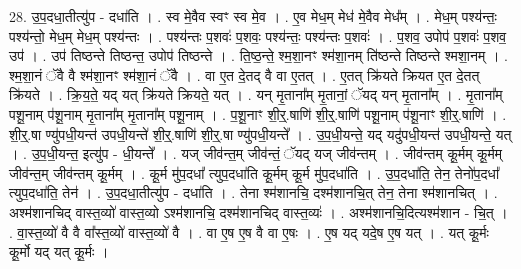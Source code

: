 \documentclass[17pt]{extarticle}
\begin{document}
28. उ॒प॒दधा॒तीत्यु॑प - दधा॑ति । . स्व मे॒वैव स्वꣳ स्व मे॒व । . ए॒व मेध॒म् मेध॑ मे॒वैव मेध᳚म् । . मेध॒म् पश्य॑न्तः॒ पश्य॑न्तो॒ मेध॒म् मेध॒म् पश्य॑न्तः । . पश्य॑न्तः प॒शवः॑ प॒शवः॒ पश्य॑न्तः॒ पश्य॑न्तः प॒शवः॑ । . प॒शव॒ उपोप॑ प॒शवः॑ प॒शव॒ उप॑ । . उप॑ तिष्ठन्ते तिष्ठन्त॒ उपोप॑ तिष्ठन्ते । . ति॒ष्ठ॒न्ते॒ श्म॒शा॒नꣳ श्म॑शा॒नम् ति॑ष्ठन्ते तिष्ठन्ते श्मशा॒नम् । . श्म॒शा॒नं ॅवै वै श्म॑शा॒नꣳ श्म॑शा॒नं ॅवै । . वा ए॒त दे॒तद् वै वा ए॒तत् । . ए॒तत् क्रि॑यते क्रियत ए॒त दे॒तत् क्रि॑यते । . क्रि॒य॒ते॒ यद् यत् क्रि॑यते क्रियते॒ यत् । . यन् मृ॒ताना᳚म् मृ॒तानां॒ ॅयद् यन् मृ॒ताना᳚म् । . मृ॒ताना᳚म् पशू॒नाम् प॑शू॒नाम् मृ॒ताना᳚म् मृ॒ताना᳚म् पशू॒नाम् । . प॒शू॒नाꣳ शी॒र्॒.षाणि॑ शी॒र्॒.षाणि॑ पशू॒नाम् प॑शू॒नाꣳ शी॒र्॒.षाणि॑ । . शी॒र्॒.षा ण्यु॑पधी॒यन्त॑ उपधी॒यन्ते॑ शी॒र्॒.षाणि॑ शी॒र्॒.षा ण्यु॑पधी॒यन्ते᳚ । . उ॒प॒धी॒यन्ते॒ यद् यदु॑पधी॒यन्त॑ उपधी॒यन्ते॒ यत् । . उ॒प॒धी॒यन्त॒ इत्यु॑प - धी॒यन्ते᳚ । . यज् जीव॑न्त॒म् जीव॑न्तं॒ ॅयद् यज् जीव॑न्तम् । . जीव॑न्तम् कू॒र्मम् कू॒र्मम् जीव॑न्त॒म् जीव॑न्तम् कू॒र्मम् । . कू॒र्म मु॑प॒दधा᳚ त्युप॒दधा॑ति कू॒र्मम् कू॒र्म मु॑प॒दधा॑ति । . उ॒प॒दधा॑ति॒ तेन॒ तेनो॑प॒दधा᳚ त्युप॒दधा॑ति॒ तेन॑ । . उ॒प॒दधा॒तीत्यु॑प - दधा॑ति । . तेना श्म॑शानचि॒ दश्म॑शानचि॒त् तेन॒ तेना श्म॑शानचित् । . अश्म॑शानचिद् वास्त॒व्यो॑ वास्त॒व्यो ऽश्म॑शानचि॒ दश्म॑शानचिद् वास्त॒व्यः॑ । . अश्म॑शानचि॒दित्यश्म॑शान - चि॒त् । . वा॒स्त॒व्यो॑ वै वै वा᳚स्त॒व्यो॑ वास्त॒व्यो॑ वै । . वा ए॒ष ए॒ष वै वा ए॒षः । . ए॒ष यद् यदे॒ष ए॒ष यत् । . यत् कू॒र्मः कू॒र्मो यद् यत् कू॒र्मः । \newline
\end{document}
